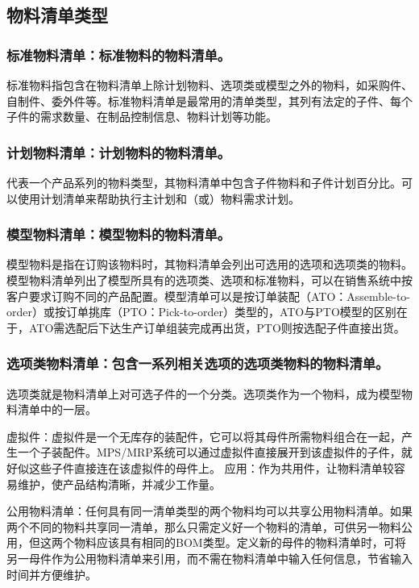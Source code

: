 \subsection {物料清单类型}

    \subsubsection {标准物料清单：标准物料的物料清单。}

    标准物料指包含在物料清单上除计划物料、选项类或模型之外的物料，如采购件、自制件、委外件等。标准物料清单是最常用的清单类型，其列有法定的子件、每个子件的需求数量、在制品控制信息、物料计划等功能。

    \subsubsection {计划物料清单：计划物料的物料清单。}

    代表一个产品系列的物料类型，其物料清单中包含子件物料和子件计划百分比。可以使用计划清单来帮助执行主计划和（或）物料需求计划。

    \subsubsection {模型物料清单：模型物料的物料清单。}

    模型物料是指在订购该物料时，其物料清单会列出可选用的选项和选项类的物料。模型物料清单列出了模型所具有的选项类、选项和标准物料，可以在销售系统中按客户要求订购不同的产品配置。模型清单可以是按订单装配（ATO：Assemble-to-order）或按订单挑库（PTO：Pick-to-order）类型的，ATO与PTO模型的区别在于，ATO需选配后下达生产订单组装完成再出货，PTO则按选配子件直接出货。

    \subsubsection {选项类物料清单：包含一系列相关选项的选项类物料的物料清单。}

    选项类就是物料清单上对可选子件的一个分类。选项类作为一个物料，成为模型物料清单中的一层。

    虚拟件：虚拟件是一个无库存的装配件，它可以将其母件所需物料组合在一起，产生一个子装配件。MPS/MRP系统可以通过虚拟件直接展开到该虚拟件的子件，就好似这些子件直接连在该虚拟件的母件上。 应用：作为共用件，让物料清单较容易维护，使产品结构清晰，并减少工作量。

    公用物料清单：任何具有同一清单类型的两个物料均可以共享公用物料清单。如果两个不同的物料共享同一清单，那么只需定义好一个物料的清单，可供另一物料公用，但这两个物料应该具有相同的BOM类型。定义新的母件的物料清单时，可将另一母件作为公用物料清单来引用，而不需在物料清单中输入任何信息，节省输入时间并方便维护。

